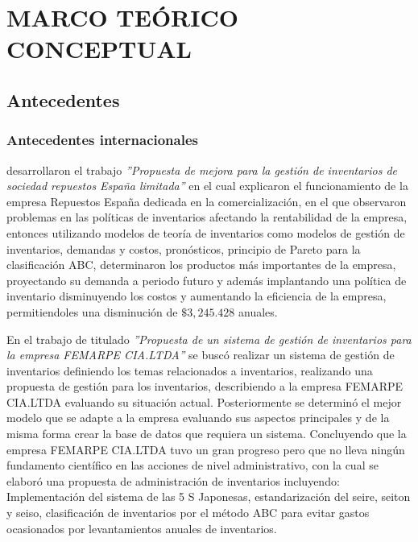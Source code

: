 \newpage
\chapter{MARCO TEÓRICO CONCEPTUAL}
\section{Antecedentes}
\subsection{Antecedentes internacionales}

\cite{gallardo2016propuesta} desarrollaron el trabajo \textsl{''Propuesta de mejora para la gestión de inventarios de sociedad repuestos España limitada''} en el cual explicaron el funcionamiento de la empresa Repuestos España dedicada en la comercialización, en el que observaron problemas en las políticas de inventarios afectando la rentabilidad de la empresa, entonces utilizando modelos de teoría de inventarios como modelos de gestión de inventarios, demandas y costos, pronósticos, principio de Pareto para la clasificación ABC, determinaron los productos más importantes de la empresa, proyectando su demanda a periodo futuro y además implantando una política de inventario disminuyendo los costos y aumentando la eficiencia de la empresa, permitiendoles una disminución de $\$3,245$.$428$ anuales.

En el trabajo de \cite{loja2015propuesta} titulado \textsl{''Propuesta de un sistema de gestión de inventarios para la empresa FEMARPE CIA.LTDA''} se buscó realizar un sistema de gestión de inventarios definiendo los temas relacionados a inventarios, realizando una propuesta de gestión para los inventarios, describiendo a la empresa FEMARPE CIA.LTDA evaluando su situación actual. Posteriormente se determinó el mejor modelo que se adapte a la empresa evaluando sus aspectos principales y de la misma forma crear la base de datos que requiera un sistema. Concluyendo que la empresa FEMARPE CIA.LTDA tuvo un gran progreso pero que no lleva ningún fundamento científico en las acciones de nivel administrativo, con la cual se elaboró una propuesta de administración de inventarios incluyendo: Implementación del sistema de las 5 S Japonesas, estandarización del seire, seiton y seiso, clasificación de inventarios por el método ABC para evitar gastos ocasionados por levantamientos anuales de inventarios.

\newpage
